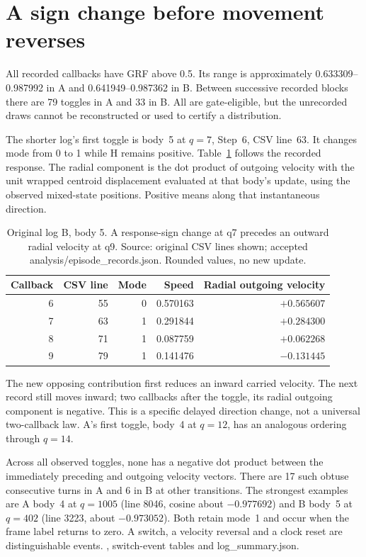 \section{A sign change before movement reverses}
All recorded callbacks have GRF above 0.5. Its range is approximately
0.633309--0.987992 in A and 0.641949--0.987362 in B.
Between successive recorded blocks there are 79 toggles in A and
33 in B. All are gate-eligible, but the unrecorded draws cannot be
reconstructed or used to certify a distribution. 

The shorter log's first toggle is body~5 at $q=7$, Step~6, CSV line~63.
It changes mode from 0 to 1 while H remains positive.
Table~\ref{tab:delay03} follows the recorded response. The radial
component is the dot product of outgoing velocity with the unit
wrapped centroid displacement evaluated at that body's update,
using the observed mixed-state positions. Positive means along
that instantaneous direction. 

\begin{table}[htbp]\centering\small
\caption{Original log B, body 5. A response-sign change at q7 precedes
an outward radial velocity at q9. Source: original CSV lines shown;
accepted analysis/episode\_records.json. Rounded values, no new update.}
\label{tab:delay03}
\begin{tabular}{@{}rrrrr@{}}\toprule
Callback & CSV line & Mode & Speed & Radial outgoing velocity\\\midrule
6&55&0&0.570163&$+0.565607$\\
7&63&1&0.291844&$+0.284300$\\
8&71&1&0.087759&$+0.062268$\\
9&79&1&0.141476&$-0.131445$\\\bottomrule
\end{tabular}
\end{table}

The new opposing contribution first reduces an inward carried
velocity. The next record still moves inward; two callbacks after
the toggle, its radial outgoing component is negative. This is a
specific delayed direction change, not a universal two-callback
law. A's first toggle, body~4 at $q=12$, has an analogous ordering
through $q=14$. 

Across all observed toggles, none has a negative dot product
between the immediately preceding and outgoing velocity vectors.
There are 17 such obtuse consecutive turns in A and 6 in B at
other transitions. The strongest examples are A body~4 at
$q=1005$ (line 8046, cosine about $-0.977692$) and B body~5 at
$q=402$ (line 3223, about $-0.973052$). Both retain mode~1 and
occur when the frame label returns to zero. A switch, a
velocity reversal and a clock reset are distinguishable events.
\cite{study03}, switch-event tables and log\_summary.json.

